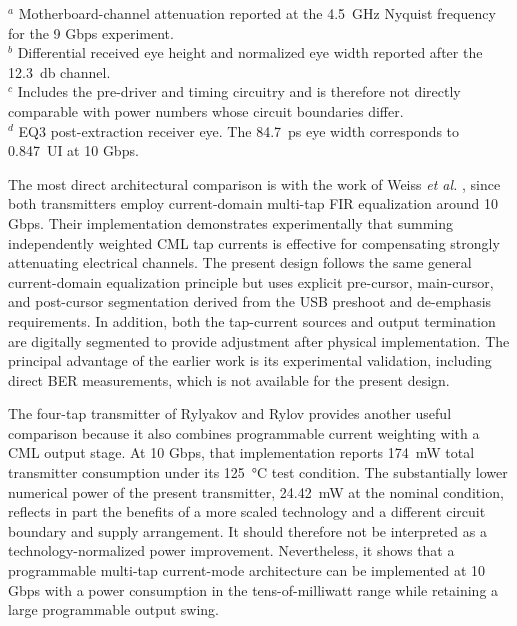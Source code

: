 \begin{table}[!ht]
{\begin{tabular}{lcccccccc}
        \hline
		\hline
    \end{tabular}}
    
    \vspace{1mm}
    \begin{minipage}{0.98\textwidth}
        \footnotesize
        $^{a}$ Motherboard-channel attenuation reported at the
        \SI{4.5}{\giga\hertz} Nyquist frequency for the
        9 Gbps experiment. \\
        $^{b}$ Differential received eye height and normalized eye width
        reported after the \SI{12.3}{\decibel} channel. \\
        $^{c}$ Includes the pre-driver and timing circuitry and is therefore
        not directly comparable with power numbers whose circuit boundaries
        differ. \\
        $^{d}$ EQ3 post-extraction receiver eye. The
        \SI{84.7}{\pico\second} eye width corresponds to 0.847~UI at
        10 Gbps.
    \end{minipage}
\end{table}

The most direct architectural comparison is with the work of Weiss \textit{et al.} \cite{weiss2006}, since both transmitters employ current-domain multi-tap \ac{FIR} equalization around 10 Gbps. Their implementation demonstrates experimentally that summing independently weighted \ac{CML} tap currents is effective for compensating strongly attenuating electrical channels. The present design follows the same general current-domain equalization principle but uses explicit pre-cursor, main-cursor, and post-cursor segmentation derived from the \ac{USB} preshoot and de-emphasis requirements. In addition, both the tap-current sources and output termination are digitally segmented to provide adjustment after physical implementation. The principal advantage of the earlier work is its experimental validation, including direct \ac{BER} measurements, which is not available for the present design.

The four-tap transmitter of Rylyakov and Rylov \cite{rylyakov2005} provides another useful comparison because it also combines programmable current weighting with a \ac{CML} output stage. At 10 Gbps, that implementation reports \SI{174}{\milli\watt} total transmitter consumption under its \SI{125}{\celsius} test condition. The substantially lower numerical power of the present transmitter, \SI{24.42}{\milli\watt} at the nominal condition, reflects in part the benefits of a more scaled technology and a different circuit boundary and supply arrangement. It should therefore not be interpreted as a technology-normalized power improvement. Nevertheless, it shows that a programmable multi-tap current-mode architecture can be implemented at 10 Gbps with a power consumption in the tens-of-milliwatt range while retaining a large programmable output swing.

